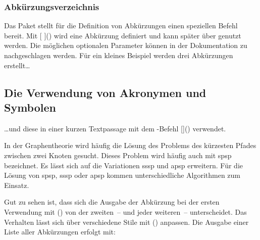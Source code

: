 \documentclass[%
  english,ngerman,%
  cdgeometry=no,DIV=12,%
  automark,%
  listof=toc,%
]{tudscrartcl}
\begin{document}
\subsubsection{Abkürzungsverzeichnis}
Das Paket  stellt für die Definition von Abkürzungen einen 
speziellen Befehl bereit. Mit [%
  \LParameter{}%
]() wird eine Abkürzung definiert und kann später über 
 genutzt werden. Die möglichen optionalen Parameter können in 
der Dokumentation zu  nachgeschlagen werden. Für ein 
kleines Beispiel werden drei Abkürzungen erstellt\dots
%
\begin{Trunk+}
\section{Die Verwendung von Akronymen und Symbolen}
\end{Trunk+}
\begin{Trunk*}

\end{Trunk*}
%
\dots und diese in einer kurzen Textpassage mit dem -Befehl
[]() verwendet.
%
\begin{Trunk*}
In der Graphentheorie wird häufig die Lösung des Problems des kürzesten
Pfades zwischen zwei Knoten gesucht. Dieses Problem wird häufig auch
mit \gls{spsp} bezeichnet. Es lässt sich auf die Variationen \gls{sssp}
und \gls{apsp} erweitern. Für die Lösung von \gls{spsp}, \gls{sssp} 
oder \gls{apsp} kommen unterschiedliche Algorithmen zum Einsatz.

\end{Trunk*}
%
Gut zu sehen ist, dass sich die Ausgabe der Abkürzung bei der ersten Verwendung 
mit () von der zweiten~-- und jeder weiteren~-- 
unterscheidet. Das Verhalten lässt sich über verschiedene Stile mit 
() anpassen. Die Ausgabe einer Liste 
aller Abkürzungen erfolgt mit:
%
\begin{Hint}
\printacronyms
\end{Hint}
%
\end{document}
